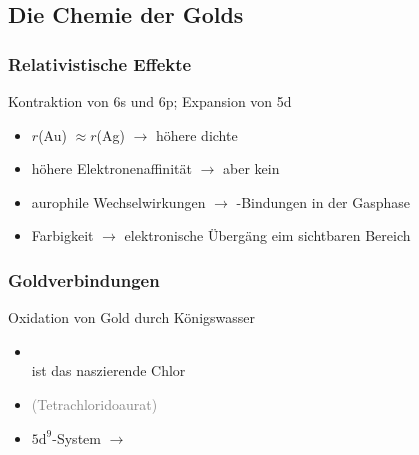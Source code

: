 \documentclass[a4paper, 12pt]{article}
\begin{document}
\subsection{Die Chemie der Golds}
\subsubsection{Relativistische Effekte}
Kontraktion von 6s und 6p; Expansion von 5d
\begin{itemize}
    \item $r$(Au) $\approx r$(Ag) $\rightarrow$ höhere dichte
    \item höhere Elektronenaffinität $\rightarrow$  aber kein 
    \item aurophile Wechselwirkungen $\rightarrow$ -Bindungen in der Gasphase
    \item Farbigkeit $\rightarrow$ elektronische Übergäng eim sichtbaren Bereich
\end{itemize}

\subsubsection{Goldverbindungen}
Oxidation von Gold durch Königswasser
\begin{itemize}
    \item[] \\ ist das naszierende Chlor
    \item[]  \textcolor{gray}{(Tetrachloridoaurat)}
    \item {} $\mathrm{5d^9}$-System $\rightarrow$ 
\end{itemize}
\end{document}
